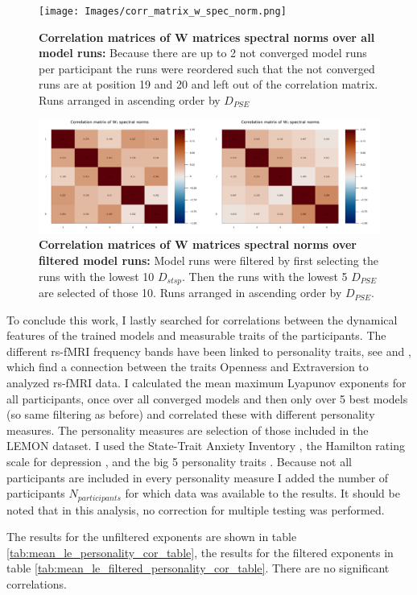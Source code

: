 \begin{figure}
    \texttt{[image: Images/corr\_matrix\_w\_spec\_norm.png]}
    \caption[Correlation matrices of W matrices spectral norms over all model runs]
    {\textbf{Correlation matrices of W matrices spectral norms over all model runs: } Because there are up to 2 not converged model runs per participant the runs were 
    reordered such that the not converged runs are at position 19 and 20 and left out of the correlation matrix. Runs arranged in ascending order by $D_{PSE}$}
    \label{fig:corr_matrix_w_spec_norm}
\end{figure}

\begin{figure}
    \includegraphics[width=\textwidth]{Images/corr_matrix_spec_norms_filtered.png}
    \caption[Correlation matrices of W matrices spectral norms over filtered model runs]
    {\textbf{Correlation matrices of W matrices spectral norms over filtered model runs: } Model runs were filtered by first selecting the runs with the lowest 10 $D_{stsp}$.
    Then the runs with the lowest 5 $D_{PSE}$ are selected of those 10. Runs arranged in ascending order by $D_{PSE}$.}
    \label{fig:corr_matrix_spec_norms_filtered}
\end{figure}

To conclude this work, I lastly searched for correlations between the dynamical features of the trained models and measurable traits of the participants. The different 
rs-fMRI frequency bands have been linked to personality traits, see \cite{ikeda2017comprehensive} and \cite{dubois2018resting}, which find a connection between 
the traits Openness and Extraversion to analyzed rs-fMRI data. I calculated the mean maximum Lyapunov exponents for all participants, once over all converged models and
then only over 5 best models (so same filtering as before) and correlated these with different personality measures. The personality measures are selection of those 
included in the LEMON dataset. I used the State-Trait Anxiety Inventory \cite{spielberger1970manual}, the Hamilton rating scale for depression \cite{hamilton1960rating}, 
and the big 5 personality traits \cite{costa1989neo}. Because not all participants are included in every personality measure I added the number of participants $N_{participants}$
for which data was available to the results. It should be noted that in this analysis, no correction for multiple testing was performed.

The results for the unfiltered exponents are shown in table \ref{tab:mean_le_personality_cor_table}, the results for the filtered exponents in
table \ref{tab:mean_le_filtered_personality_cor_table}. There are no significant correlations. 


